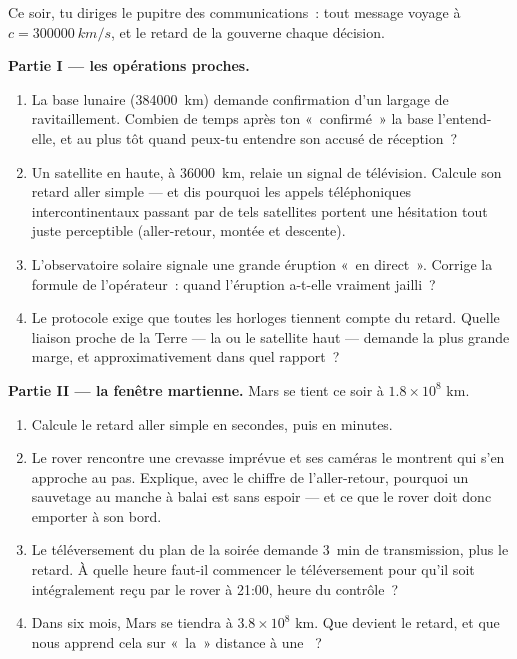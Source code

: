 \begin{problem}\label{pb:g8:speed-of-light:1}
Ce soir, tu diriges le pupitre des communications~: tout message
voyage à $c = \qty{300000}{km/s}$, et le retard de la 
gouverne chaque décision.

\medskip\noindent\textbf{Partie I --- les opérations proches.}
\begin{enumerate}
  \item La base lunaire (\qty{384000}{km}) demande confirmation d'un
        largage de ravitaillement. Combien de temps après ton
        «~confirmé~» la base l'entend-elle, et au plus tôt quand
        peux-tu entendre son accusé de réception~?
  \item Un satellite en  haute, à \qty{36000}{km}, relaie un
        signal de télévision. Calcule son retard aller simple --- et
        dis pourquoi les appels téléphoniques intercontinentaux
        passant par de tels satellites portent une hésitation tout
        juste perceptible (aller-retour, montée et descente).
  \item L'observatoire solaire signale une grande éruption
        «~en direct~». Corrige la formule de l'opérateur~: quand
        l'éruption a-t-elle vraiment jailli~?
  \item Le protocole exige que toutes les horloges tiennent compte
        du retard. Quelle liaison proche de la Terre --- la  ou
        le satellite haut --- demande la plus grande marge, et
        approximativement dans quel rapport~?
\end{enumerate}

\medskip\noindent\textbf{Partie II --- la fenêtre martienne.}
Mars se tient ce soir à $1.8 \times 10^{8}$ km.
\begin{enumerate}[resume]
  \item Calcule le retard aller simple en secondes, puis en minutes.
  \item Le rover rencontre une crevasse imprévue et ses caméras le
        montrent qui s'en approche au pas. Explique, avec le chiffre
        de l'aller-retour, pourquoi un sauvetage au manche à balai
        est sans espoir --- et ce que le rover doit donc emporter à
        son bord.
  \item Le téléversement du plan de la soirée demande \qty{3}{min}
        de transmission, plus le retard. À quelle heure faut-il
        commencer le téléversement pour qu'il soit intégralement
        reçu par le rover à 21:00, heure du contrôle~?
  \item Dans six mois, Mars se tiendra à $3.8 \times 10^{8}$ km.
        Que devient le retard, et que nous apprend cela sur «~la~»
        distance à une ~?
\end{enumerate}


\end{problem}

